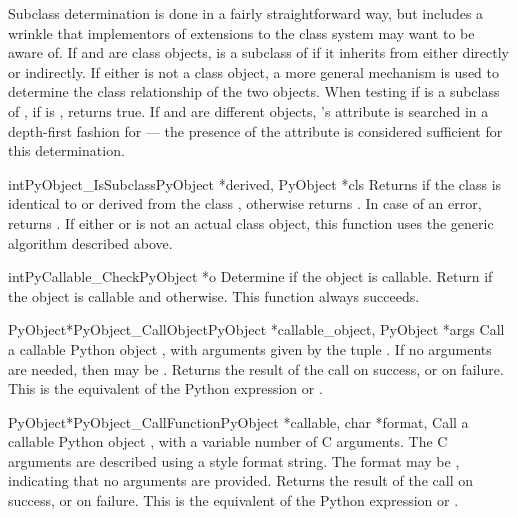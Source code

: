 Subclass determination is done in a fairly straightforward way, but
includes a wrinkle that implementors of extensions to the class system
may want to be aware of.  If  and  are class
objects,  is a subclass of  if it inherits from
 either directly or indirectly.  If either is not a class
object, a more general mechanism is used to determine the class
relationship of the two objects.  When testing if  is a
subclass of , if  is ,
 returns true.  If  and
 are different objects, 's  attribute
is searched in a depth-first fashion for  --- the presence of
the  attribute is considered sufficient for this
determination.

\begin{cfuncdesc}{int}{PyObject_IsSubclass}{PyObject *derived,
                                            PyObject *cls}
  Returns  if the class  is identical to or
  derived from the class , otherwise returns .  In
  case of an error, returns .  If either  or
   is not an actual class object, this function uses the
  generic algorithm described above.
\end{cfuncdesc}


\begin{cfuncdesc}{int}{PyCallable_Check}{PyObject *o}
  Determine if the object  is callable.  Return  if the
  object is callable and  otherwise.  This function always
  succeeds.
\end{cfuncdesc}


\begin{cfuncdesc}{PyObject*}{PyObject_CallObject}{PyObject *callable_object,
                                                  PyObject *args}
  Call a callable Python object , with arguments
  given by the tuple .  If no arguments are needed, then
   may be \NULL.  Returns the result of the call on
  success, or \NULL{} on failure.  This is the equivalent of the
  Python expression  or
  .
\end{cfuncdesc}

\begin{cfuncdesc}{PyObject*}{PyObject_CallFunction}{PyObject *callable,
                                                    char *format, \moreargs}
  Call a callable Python object , with a variable
  number of C arguments.  The C arguments are described using a
   style format string.  The format may be
  \NULL, indicating that no arguments are provided.  Returns the
  result of the call on success, or \NULL{} on failure.  This is the
  equivalent of the Python expression  or .
\end{cfuncdesc}



